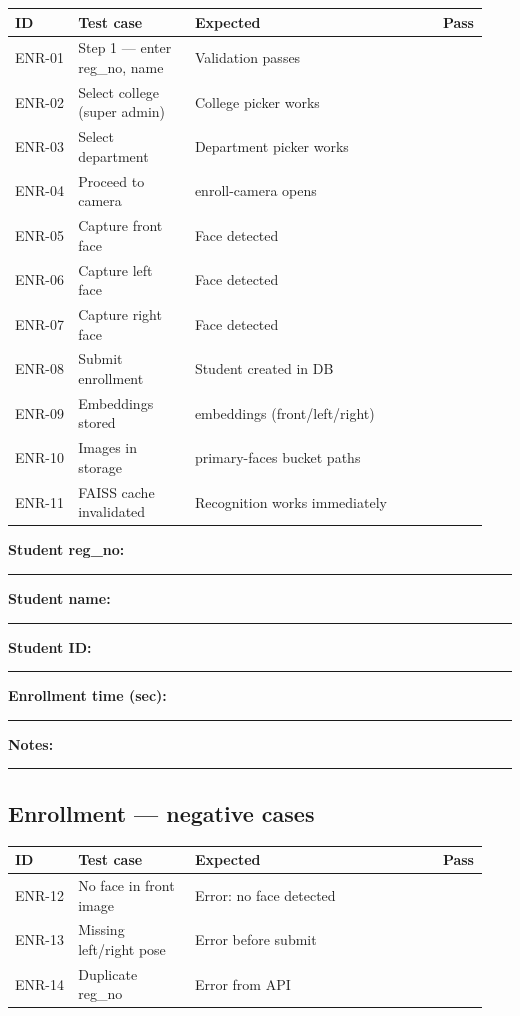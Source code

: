 \documentclass[11pt,a4paper,oneside]{article}
\newcommand{\chk}{\fbox{\rule{0pt}{1.05ex}\rule{1.05ex}{0pt}}}
\newcommand{\fillin}[1][3.5cm]{\rule{#1}{0.4pt}}
\newcommand{\fillinlong}{\rule{0.72\textwidth}{0.4pt}}
\newcommand{\notesblock}{\par\smallskip\noindent\textbf{Notes:}\ \fillinlong\par\smallskip}
\newcommand{\fieldline}[1]{\par\smallskip\noindent\textbf{#1}\ \fillin\par}
\newcommand{\tcheadfour}{%
  \toprule
  \textbf{ID} & \textbf{Test case} & \textbf{Expected} & \textbf{Pass} \\
  \midrule
}
\begin{document}
\small
\begin{tabular}{@{}>{\raggedright\arraybackslash}p{0.13\linewidth} >{\raggedright\arraybackslash}p{0.24\linewidth} >{\raggedright\arraybackslash}p{0.51\linewidth} >{\centering\arraybackslash}p{0.06\linewidth}@{}}
  \tcheadfour
  ENR-01 & Step 1 — enter reg\_no, name & Validation passes                    & \chk \\
  ENR-02 & Select college (super admin) & College picker works                 & \chk \\
  ENR-03 & Select department            & Department picker works              & \chk \\
  ENR-04 & Proceed to camera            & enroll-camera opens                  & \chk \\
  ENR-05 & Capture front face           & Face detected                        & \chk \\
  ENR-06 & Capture left face            & Face detected                        & \chk \\
  ENR-07 & Capture right face           & Face detected                        & \chk \\
  ENR-08 & Submit enrollment            & Student created in DB                & \chk \\
  ENR-09 & Embeddings stored            & 3 embeddings (front/left/right)      & \chk \\
  ENR-10 & Images in storage            & primary-faces bucket paths           & \chk \\
  ENR-11 & FAISS cache invalidated      & Recognition works immediately        & \chk \\
  \bottomrule
\end{tabular}
\normalsize

\fieldline{Student reg\_no:}
\fieldline{Student name:}
\fieldline{Student ID:}
\fieldline{Enrollment time (sec):}
\notesblock

\subsection{Enrollment — negative cases}

\small
\begin{tabular}{@{}>{\raggedright\arraybackslash}p{0.13\linewidth} >{\raggedright\arraybackslash}p{0.24\linewidth} >{\raggedright\arraybackslash}p{0.51\linewidth} >{\centering\arraybackslash}p{0.06\linewidth}@{}}
  \tcheadfour
  ENR-12 & No face in front image  & Error: no face detected  & \chk \\
  ENR-13 & Missing left/right pose & Error before submit      & \chk \\
  ENR-14 & Duplicate reg\_no       & Error from API           & \chk \\
  \bottomrule
\end{tabular}
\normalsize
\end{document}
